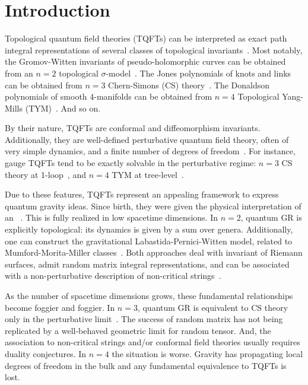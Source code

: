 \documentclass[../main.tex]{subfiles}
\begin{document}
\section{Introduction}\label{sec:introduction}

Topological quantum field theories (TQFTs) can be interpreted as exact path integral representations of several classes of topological invariants~\cite{birmingham1991a,blau1993a,cordes1995a}. Most notably, the Gromov-Witten invariants of pseudo-holomorphic curves can be obtained from an $ n=2 $ topological $ \sigma $-model~\cite{witten1988c}. The Jones polynomials of knots and links can be obtained from $ n=3 $ Chern-Simons (CS) theory~\cite{witten1989a}. The Donaldson polynomials of smooth 4-manifolds can be obtained from $ n=4 $ Topological Yang-Mills (TYM)~\cite{witten1988d}. And so on.

By their nature, TQFTs are conformal and diffeomorphism invariants. Additionally, they are well-defined perturbative quantum field theory, often of very simple dynamics, and a finite number of degrees of freedom~\cite{brandhuber1994a,werneck1993a,sadovski2018b,sadovski2020}. For instance, gauge TQFTs tend to be exactly solvable in the perturbative regime: $ n=3 $ CS theory at 1-loop~\cite{blasi1991a,maggiore1992a,piguet1995a}, and $ n=4 $ TYM at tree-level~\cite{sadovski2017c,sadovski2018a}.

Due to these features, TQFTs represent an appealing framework to express quantum gravity ideas. Since birth, they were given the physical interpretation of an ~\cite{witten1988d}. This is fully realized in low spacetime dimensions. In $n=2$, quantum GR is explicitly topological: its dynamics is given by a sum over genera. Additionally, one can construct the gravitational Labastida-Pernici-Witten model, related to Mumford-Morita-Miller classes~\cite{labastida1988b,labastida1988a}. Both approaches deal with invariant of Riemann surfaces, admit random matrix integral representations, and can be associated with a non-perturbative description of non-critical strings~\cite{douglas1990a,dijkgraaf1991a,gross1990a,witten1990a,kontsevich1992a,dijkgraaf2002a}.

As the number of spacetime dimensions grows, these fundamental relationships become foggier and foggier. In $ n=3 $, quantum GR is equivalent to CS theory only in the perturbative limit~\cite{witten1988b,witten2007a}. The success of random matrix has not being replicated by a well-behaved geometric limit for random tensor. And, the association to non-critical strings and/or conformal field theories usually requires duality conjectures. In $ n=4 $ the situation is worse. Gravity has propagating local degrees of freedom  in the bulk and any fundamental equivalence to TQFTs is lost.
\end{document}
